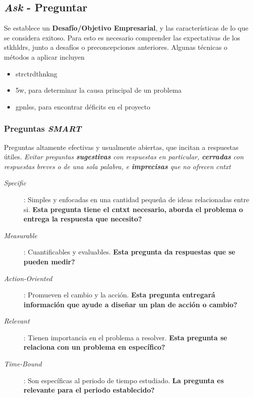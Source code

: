 
\subsection{\textit{Ask} - Preguntar}
Se establece un \textbf{Desafío/Objetivo Empresarial}, y las características de lo que se considera exitoso. Para esto es necesario comprender las expectativas de los \gls{stkhldrs}, junto a desafíos o preconcepciones anteriores. Algunas técnicas o métodos a aplicar incluyen
\begin{itemize}
    \item {\gls{strctrdthnkng}}
    \item {\gls{5w}, para determinar la causa principal de un problema}
    \item {\gls{gpnlss}, para encontrar déficits en el proyecto}
\end{itemize}


\subsubsection{Preguntas \textit{SMART}}
Preguntas altamente efectivas y usualmente abiertas, que incitan a respuestas útiles. \textit{Evitar preguntas \textbf{sugestivas} con respuestas en particular, \textbf{cerradas} con respuestas breves o de una sola palabra, e \textbf{imprecisas} que no ofrecen \gls{cntxt}}
\begin{description}
    \item [\textit{Specific}]{ : Simples y enfocadas en una cantidad pequeña de ideas relacionadas entre si. \textbf{Esta pregunta tiene el \gls{cntxt} necesario, aborda el problema o entrega la respuesta que necesito?}}
    \item [\textit{Measurable}]{ : Cuantificables y evaluables. \textbf{Esta pregunta da respuestas que se pueden medir?}}
    \item [\textit{Action-Oriented}]{ : Promueven el cambio y la acción. \textbf{Esta pregunta entregará información que ayude a diseñar un plan de acción o cambio?}}
    \item [\textit{Relevant}]{ : Tienen importancia en el problema a resolver. \textbf{Esta pregunta se relaciona con un problema en específico?}}
    \item [\textit{Time-Bound}]{ : Son específicas al periodo de tiempo estudiado. \textbf{La pregunta es relevante para el periodo establecido?}}
\end{description}

